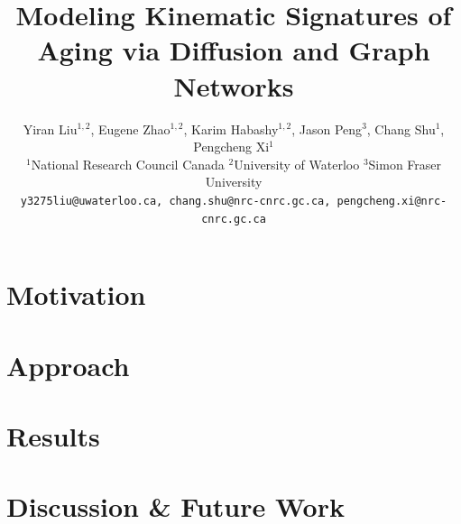 \documentclass[10pt,twocolumn,letterpaper]{article}
\title{Modeling Kinematic Signatures of Aging via Diffusion and Graph Networks}
\author{
Yiran Liu$^{1,2}$, Eugene Zhao$^{1,2}$, Karim Habashy$^{1,2}$, Jason Peng$^{3}$, Chang Shu$^{1}$, Pengcheng Xi$^{1}$ \\
$^{1}$National Research Council Canada \quad
$^{2}$University of Waterloo \quad
$^{3}$Simon Fraser University \\
{\tt\small y3275liu@uwaterloo.ca, chang.shu@nrc-cnrc.gc.ca, pengcheng.xi@nrc-cnrc.gc.ca}
}
\begin{document}
\maketitle

\begin{abstract}
	
\end{abstract}

\section{Motivation}


\section{Approach}


% 

\section{Results}


\section{Discussion \& Future Work}


\clearpage


\clearpage
{\small
	
	
}
\end{document}
